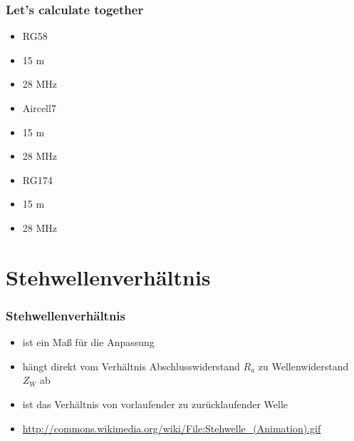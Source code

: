 \begin{frame}
\frametitle{Let's calculate together}
\begin{minipage}{0.3\textwidth}
\begin{itemize}
 	\item RG58\\
 	\item 15 m\\
 	\item 28 MHz
 \end{itemize}
\end{minipage}
\begin{minipage}{0.3\textwidth}
\begin{itemize}
 	\item Aircell7\\
 	\item 15 m\\
 	\item 28 MHz
 \end{itemize}
\end{minipage}
\begin{minipage}{0.3\textwidth}
\begin{itemize}
 	\item RG174\\
 	\item 15 m\\
 	\item 28 MHz
 \end{itemize}
\end{minipage}
\end{frame}

\section*{Stehwellenverh\"altnis}
\begin{frame}
\frametitle{Stehwellenverh\"altnis}
\begin{itemize}
	\item ist ein Maß für die Anpassung
	\item	hängt direkt vom Verhältnis Abschlusswiderstand $R_a$ zu Wellenwiderstand $Z_W$ ab
	\vspace{2mm}
	\vspace{2mm}
	\item ist das Verhältnis von vorlaufender zu zurücklaufender Welle
	\item \url{http://commons.wikimedia.org/wiki/File:Stehwelle_(Animation).gif}
\end{itemize}
\end{frame}

